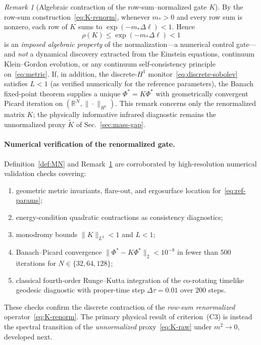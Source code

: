 \documentclass{iopjournal}
\theoremstyle{remark}
\newtheorem{remark}[theorem]{Remark}
\begin{document}
\begin{remark}[Algebraic contraction of the row-sum--normalized gate $K$]
\label{rem:renorm-gate}
By the row-sum construction~\eqref{eq:K-renorm}, whenever $m_{\ast}>0$ and every row sum is nonzero, each row of $K$ sums to $\exp(-m_{\ast}\Delta\ell)<1$.
Hence
\[
\rho(K)\le\exp(-m_{\ast}\Delta\ell)<1
\]
is an \emph{imposed algebraic property} of the normalization---a numerical control gate---and \emph{not} a dynamical discovery extracted from the Einstein equations, continuum Klein--Gordon evolution, or any continuum self-consistency principle on~\eqref{eq:metric}.
If, in addition, the discrete-$H^{1}$ monitor~\eqref{eq:discrete-sobolev} satisfies $L<1$ (as verified numerically for the reference parameters), the Banach fixed-point theorem supplies a unique $\Phi^{*}=K\Phi^{*}$ with geometrically convergent Picard iteration on $(\mathbb{R}^{N},\|\cdot\|_{H^{1}})$.
This remark concerns only the renormalized matrix $K$; the physically informative infrared diagnostic remains the unnormalized proxy $\widetilde{K}$ of Sec.~\ref{sec:mass-gap}.
\end{remark}

\paragraph{Numerical verification of the renormalized gate.}
\label{sec:numerical}
Definition~\ref{def:MN} and Remark~\ref{rem:renorm-gate} are corroborated by high-resolution numerical validation checks covering:
\begin{enumerate}
  \item[(i)] geometric metric invariants, flare-out, and ergosurface location for~\eqref{eq:ref-params};
  \item[(ii)] energy-condition quadratic contractions as consistency diagnostics;
  \item[(iii)] monodromy bounds $\|K\|_{L^{2}}<1$ and $L<1$;
  \item[(iv)] Banach--Picard convergence $\|\Phi^{*}-K\Phi^{*}\|_{2}<10^{-8}$ in fewer than $500$ iterations for $N\in\{32,64,128\}$;
  \item[(v)] classical fourth-order Runge--Kutta integration of the co-rotating timelike geodesic diagnostic with proper-time step $\Delta\tau=0.01$ over $200$ steps.
\end{enumerate}
These checks confirm the discrete contraction of the \emph{row-sum renormalized} operator~\eqref{eq:K-renorm}.
The primary physical result of criterion~(C3) is instead the spectral transition of the \emph{unnormalized} proxy~\eqref{eq:K-raw} under $m^{2}\to 0$, developed next.
\end{document}
